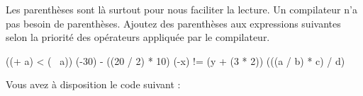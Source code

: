 \documentclass[10pt, a4paper, answers]{\path exam}
\begin{document}
\begin{questions}

\question
Les parenthèses sont là surtout pour nous faciliter la lecture. Un compilateur n'a pas besoin de parenthèses. Ajoutez des parenthèses aux expressions suivantes selon la priorité des opérateurs appliquée par le compilateur. 


\begin{solution}
	\begin{verbatim_lst}
((+ a) < (~ a))
(-30) - ((20 / 2) * 10)
(-x) != (y + (3 * 2))
(((a / b) * c) / d)		
	\end{verbatim_lst}
\end{solution}

\newpage

\question
Vous avez à disposition le code suivant : 


\end{questions}
\end{document}
